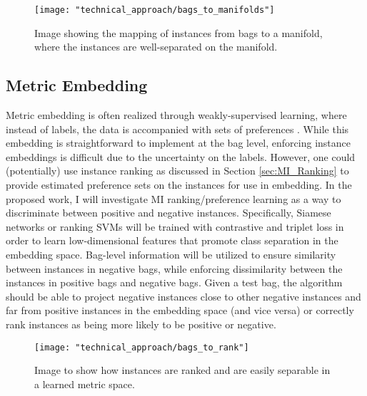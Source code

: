 \begin{center}
	\begin{figure*}[h]
		\centering
		\texttt{[image: "technical\_approach/bags\_to\_manifolds"]}
		\caption[Proposed manifold learning]{Image showing the mapping of instances from bags to a manifold, where the instances are well-separated  on the manifold.}
		\label{fig:proposed_manifold_learning}
	\end{figure*}
\end{center}

\subsection{Metric Embedding}
Metric embedding is often realized through weakly-supervised learning, where instead of labels, the data is accompanied with sets of preferences \citep{Hermans2017DefenseTripletLoss,Koch2015SiameseNetworks,Schroff2015FaceNet}. While this embedding is straightforward to implement at the bag level, enforcing instance embeddings is difficult due to the uncertainty on the labels.  However, one could (potentially) use instance ranking as discussed in Section \ref{sec:MI_Ranking} to provide estimated preference sets on the instances for use in embedding.  In the proposed work, I will investigate MI ranking/preference learning as a way to discriminate between positive and negative instances.  Specifically, Siamese networks or ranking SVMs will be trained with contrastive and triplet loss in order to learn low-dimensional features that promote class separation in the embedding space.  Bag-level information will be utilized to ensure similarity between instances in negative bags, while enforcing dissimilarity between the instances in positive bags and negative bags.  Given a test bag, the algorithm should be able to project negative instances close to other negative instances and far from positive instances in the embedding space (and vice versa) or correctly rank instances as being more likely to be positive or negative.

\begin{center}
	\begin{figure*}[h]
		\centering
		\texttt{[image: "technical\_approach/bags\_to\_rank"]}
		\caption[Proposed metric embedding]{Image to show how instances are ranked and are easily separable in a learned metric space.}
		\label{fig:proposed_metric_embedding}
	\end{figure*}
\end{center}

